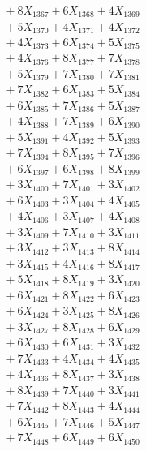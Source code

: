 \documentclass[a4paper,10pt]{article}
\begin{document}
{\begin{align}
&\;  + 8 X_{1367} + 6 X_{1368} + 4 X_{1369} \\[0.3ex]
&\;  + 5 X_{1370} + 4 X_{1371} + 4 X_{1372} \\[0.3ex]
&\;  + 4 X_{1373} + 6 X_{1374} + 5 X_{1375} \\[0.3ex]
&\;  + 4 X_{1376} + 8 X_{1377} + 7 X_{1378} \\[0.3ex]
&\;  + 5 X_{1379} + 7 X_{1380} + 7 X_{1381} \\[0.3ex]
&\;  + 7 X_{1382} + 6 X_{1383} + 5 X_{1384} \\[0.3ex]
&\;  + 6 X_{1385} + 7 X_{1386} + 5 X_{1387} \\[0.3ex]
&\;  + 4 X_{1388} + 7 X_{1389} + 6 X_{1390} \\[0.5ex]\allowbreak
&\;  + 5 X_{1391} + 4 X_{1392} + 5 X_{1393} \\[0.3ex]
&\;  + 7 X_{1394} + 8 X_{1395} + 7 X_{1396} \\[0.3ex]
&\;  + 6 X_{1397} + 6 X_{1398} + 8 X_{1399} \\[0.3ex]
&\;  + 3 X_{1400} + 7 X_{1401} + 3 X_{1402} \\[0.3ex]
&\;  + 6 X_{1403} + 3 X_{1404} + 4 X_{1405} \\[0.3ex]
&\;  + 4 X_{1406} + 3 X_{1407} + 4 X_{1408} \\[0.3ex]
&\;  + 3 X_{1409} + 7 X_{1410} + 3 X_{1411} \\[0.3ex]
&\;  + 3 X_{1412} + 3 X_{1413} + 8 X_{1414} \\[0.3ex]
&\;  + 3 X_{1415} + 4 X_{1416} + 8 X_{1417} \\[0.3ex]
&\;  + 5 X_{1418} + 8 X_{1419} + 3 X_{1420} \\[0.5ex]\allowbreak
&\;  + 6 X_{1421} + 8 X_{1422} + 6 X_{1423} \\[0.3ex]
&\;  + 6 X_{1424} + 3 X_{1425} + 8 X_{1426} \\[0.3ex]
&\;  + 3 X_{1427} + 8 X_{1428} + 6 X_{1429} \\[0.3ex]
&\;  + 6 X_{1430} + 6 X_{1431} + 3 X_{1432} \\[0.3ex]
&\;  + 7 X_{1433} + 4 X_{1434} + 4 X_{1435} \\[0.3ex]
&\;  + 4 X_{1436} + 8 X_{1437} + 3 X_{1438} \\[0.3ex]
&\;  + 8 X_{1439} + 7 X_{1440} + 3 X_{1441} \\[0.3ex]
&\;  + 7 X_{1442} + 8 X_{1443} + 4 X_{1444} \\[0.3ex]
&\;  + 6 X_{1445} + 7 X_{1446} + 5 X_{1447} \\[0.3ex]
&\;  + 7 X_{1448} + 6 X_{1449} + 6 X_{1450} \\[0.5ex]\allowbreak

\end{align}}
\end{document}
